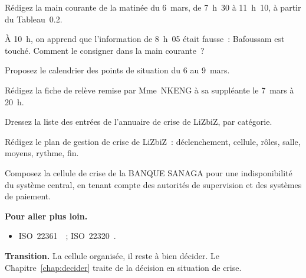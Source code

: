 \begin{boxexo}[title={\ding{45}\quad Exercice~22.4. Une main courante \niveaumoyen}]
Rédigez la main courante de la matinée du 6~mars, de 7~h~30 à 11~h~10, à
partir du Tableau~0.2.
\end{boxexo}

\begin{boxexo}[title={\ding{45}\quad Exercice~22.5. Corriger \niveaumoyen}]
À 10~h, on apprend que l'information de 8~h~05 était fausse~: Bafoussam
est touché. Comment le consigner dans la main courante~?
\end{boxexo}

\begin{boxexo}[title={\ding{45}\quad Exercice~22.6. Le rythme \niveaumoyen}]
Proposez le calendrier des points de situation du 6 au 9~mars.
\end{boxexo}

\begin{boxexo}[title={\ding{45}\quad Exercice~22.7. La relève \niveaumoyen}]
Rédigez la fiche de relève remise par Mme~NKENG à sa suppléante le
7~mars à 20~h.
\end{boxexo}

\begin{boxexo}[title={\ding{45}\quad Exercice~22.8. L'annuaire \niveaumoyen}]
Dressez la liste des entrées de l'annuaire de crise de LiZbiZ, par
catégorie.
\end{boxexo}

\begin{boxexo}[title={\ding{45}\quad Exercice~22.9. Le plan de gestion de crise \niveauexpert}]
Rédigez le plan de gestion de crise de LiZbiZ~: déclenchement, cellule,
rôles, salle, moyens, rythme, fin.
\end{boxexo}

\begin{boxexo}[title={\ding{45}\quad Exercice~22.10. La cellule bancaire \niveauexpert}]
Composez la cellule de crise de la BANQUE SANAGA pour une indisponibilité du
système central, en tenant compte des autorités de supervision et des
systèmes de paiement.
\end{boxexo}

\bigskip

\begin{boxinfo}
\textbf{Pour aller plus loin.}
\begin{itemize}
    \item ISO~22361~\cite{iso22361_2022}~; ISO~22320~\cite{iso22320_2018}.
\end{itemize}
\end{boxinfo}

\begin{boxinfo}
\textbf{Transition.} La cellule organisée, il reste à bien décider. Le
Chapitre~\ref{chap:decider} traite de la décision en situation de crise.
\end{boxinfo}
